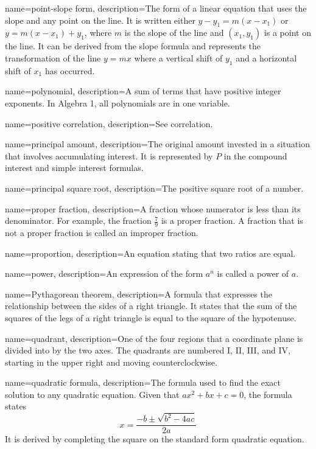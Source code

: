  {
	name=point-slope form,
	description={The form of a linear equation that uses the slope and any point on the line. It is written either $y-y_1 = m(x-x_1)$ or $y=m(x-x_1)+y_1$, where $m$ is the slope of the line and $(x_1,y_1)$ is a point on the line. It can be derived from the slope formula and represents the transformation of the line $y = mx$ where a vertical shift of $y_1$ and a horizontal shift of $x_1$ has occurred.}
}

 {
	name=polynomial,
	description={A sum of terms that have positive integer exponents. In Algebra 1, all polynomials are in one variable.}
}

 {
	name=positive correlation,
	description={See \gls{correlation}.}
}

 {
	name=principal amount,
	description={The original amount invested in a situation that involves accumulating interest. It is represented by $P$ in the \gls{compound interest} and simple interest formulas.}
}

 {
	name=principal square root,
	description={The positive square root of a number.}
}

 {
	name=proper fraction,
	description={A fraction whose \gls{numerator} is less than its \gls{denominator}. For example, the fraction $\frac{7}{9}$ is a proper fraction. A fraction that is not a proper fraction is called an \gls{improper fraction}.}
}

 {
	name=proportion,
	description={An equation stating that two ratios are equal.}
}

 {
	name=power,
	description={An expression of the form $a^n$ is called a power of $a$.}
}
 
 {
	name=Pythagorean theorem,
	description={A formula that expresses the relationship between the sides of a right triangle. It states that the sum of the squares of the legs of a right triangle is equal to the square of the \gls{hypotenuse}.}
}

 {
	name=quadrant,
	description={One of the four regions that a coordinate plane is divided into by the two axes. The quadrants are numbered I, II, III, and IV, starting in the upper right and moving counterclockwise.}
}

 {
	name=quadratic formula,
	description={The formula used to find the exact solution to any quadratic equation. Given that $ax^2+bx+c=0$, the formula states \[x = \frac{-b \pm \sqrt{b^2 - 4ac}}{2a}\] It is derived by completing the square on the standard form quadratic equation.}
}

